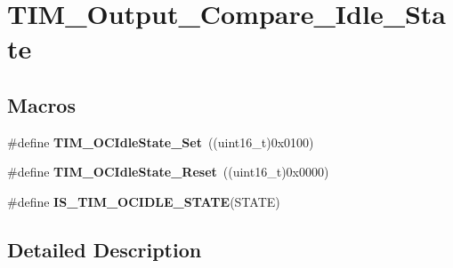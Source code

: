 \hypertarget{group___t_i_m___output___compare___idle___state}{\section{T\-I\-M\-\_\-\-Output\-\_\-\-Compare\-\_\-\-Idle\-\_\-\-State}
\label{group___t_i_m___output___compare___idle___state}
}
\subsection*{Macros}
\begin{DoxyCompactItemize}
\item 
\hypertarget{group___t_i_m___output___compare___idle___state_ga86d8f895a1ec584323f6c02c7edfad4c}{\#define {\bfseries T\-I\-M\-\_\-\-O\-C\-Idle\-State\-\_\-\-Set}~((uint16\-\_\-t)0x0100)}\label{group___t_i_m___output___compare___idle___state_ga86d8f895a1ec584323f6c02c7edfad4c}

\item 
\hypertarget{group___t_i_m___output___compare___idle___state_gace5465bc9e90ba7862b3af9e6cc9b97e}{\#define {\bfseries T\-I\-M\-\_\-\-O\-C\-Idle\-State\-\_\-\-Reset}~((uint16\-\_\-t)0x0000)}\label{group___t_i_m___output___compare___idle___state_gace5465bc9e90ba7862b3af9e6cc9b97e}

\item 
\#define {\bfseries I\-S\-\_\-\-T\-I\-M\-\_\-\-O\-C\-I\-D\-L\-E\-\_\-\-S\-T\-A\-T\-E}(S\-T\-A\-T\-E)
\end{DoxyCompactItemize}


\subsection{Detailed Description}


